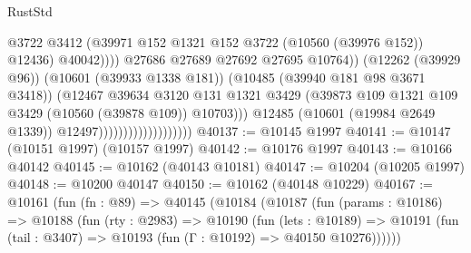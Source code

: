 \begin{lexlean}{RustStd}
\begin{coremodule}
                                                        @3722
                                                        @3412
                                                        (@39971
                                                          @152
                                                          @1321
                                                          @152
                                                          @3722
                                                          (@10560 (@39976 @152))
                                                          @12436)
                                                        @40042))))
                                                @27686
                                                @27689
                                                @27692
                                                @27695
                                                @10764))
                                            (@12262 (@39929 @96))
                                            (@10601 (@39933 @1338 @181))
                                            (@10485 (@39940 @181 @98 @3671 @3418))
                                            (@12467
                                              @39634
                                              @3120
                                              @131
                                              @1321
                                              @3429
                                              (@39873
                                                @109
                                                @1321
                                                @109
                                                @3429
                                                (@10560 (@39878 @109))
                                                @10703)))
                                          @12485
                                          (@10601 (@19984 @2649 @1339))
                                          @12497)))))))))))))))))))
@40137 := @10145 @1997
@40141 := @10147 (@10151 @1997) (@10157 @1997)
@40142 := @10176 @1997
@40143 := @10166 @40142
@40145 := @10162 (@40143 @10181)
@40147 := @10204 (@10205 @1997)
@40148 := @10200 @40147
@40150 := @10162 (@40148 @10229)
@40167 := @10161
    (fun (fn : @89) =>
    @40145
      (@10184
        (@10187
          (fun (params : @10186) =>
          @10188
            (fun (rty : @2983) =>
            @10190
              (fun (lets : @10189) =>
              @10191 (fun (tail : @3407) => @10193 (fun (Γ : @10192) => @40150 @10276))))))

\end{coremodule}
\end{lexlean}
